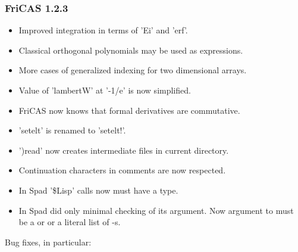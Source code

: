 \subsubsection{FriCAS 1.2.3}
\begin{itemize}

\item Improved integration in terms of 'Ei' and 'erf'.

\item Classical orthogonal polynomials may be used as expressions.

\item More cases of generalized indexing for two dimensional arrays.

\item Value of 'lambertW' at '-1/e' is now simplified.

\item FriCAS now knows that formal derivatives are commutative.

\item 'setelt' is renamed to 'setelt!'.

\item ')read' now creates intermediate files in current directory.

\item Continuation characters in comments are now respected.

\item In Spad '\$Lisp' calls now must have a type.

\item In Spad  did only minimal checking of its argument.
  Now argument to  must be a  or 
  or a literal list of -s.

\end{itemize}

Bug fixes, in particular:

